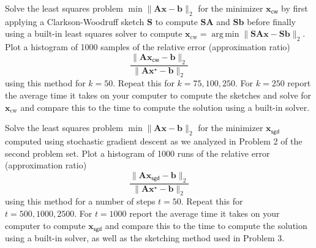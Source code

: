 \documentclass[12pt,letterpaper,cm]{hmcpset}
\newcommand\A{\boldsymbol{A}}
\renewcommand\S{\boldsymbol{S}}
\renewcommand\b{\boldsymbol{b}}
\newcommand\x{\boldsymbol{x}}
\begin{document}
\begin{solution}
\end{solution}

\begin{problem}[3]
    Solve the least squares problem $\min\|\A\x - \b\|_2$ for the minimizer $\x_\textsf{cw}$ by first applying a Clarkson-Woodruff sketch $\S$ to compute $\S\A$ and $\S\b$ before finally using a built-in least squares solver to compute $\x_\text{cw} = \operatorname{arg\,min}\|\S\A\x - \S\b\|_2$. Plot a histogram of 1000 samples of the relative error (approximation ratio)
    \[
        \frac{\|\A\x_\textsf{cw} - \b\|_2}{\|\A\x^\star - \b\|_2}
    \]
    using this method for $k=50$. Repeat this for $k=75,100,250$. For $k=250$ report the average time it takes on your computer to compute the sketches and solve for $\x_\text{cw}$ and compare this to the time to compute the solution using a built-in solver.
\end{problem}

\begin{solution}
\end{solution}

\begin{problem}[4]
    Solve the least squares problem $\min\|\A\x - \b\|_2$ for the minimizer $\x_\textsf{sgd}$ computed using stochastic gradient descent as we analyzed in Problem 2 of the second problem set. Plot a histogram of 1000 runs of the relative error (approximation ratio)
    \[
        \frac{\|\A\x_\textsf{sgd} - \b\|_2}{\|\A\x^\star - \b\|_2}
    \]
    using this method for a number of steps $t=50$. Repeat this for $t=500,1000,2500$. For $t=1000$ report the average time it takes on your computer to compute $\x_\textsf{sgd}$ and compare this to the time to compute the solution using a built-in solver, as well as the sketching method used in Problem 3.
\end{problem}

\begin{solution}
\end{solution}
\end{document}
